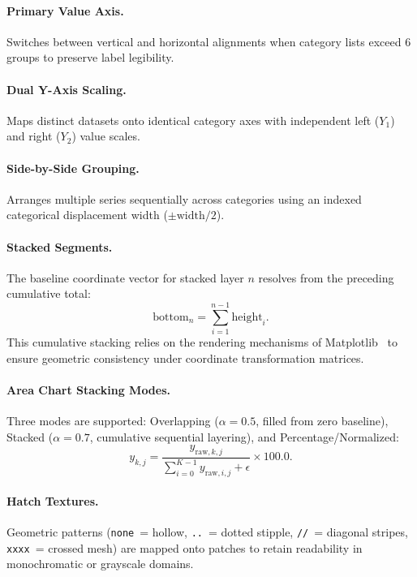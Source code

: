 \documentclass[11pt,twocolumn]{article}
\begin{document}
\paragraph{Primary Value Axis.} Switches between vertical and horizontal alignments when category lists exceed 6 groups to preserve label legibility.

\paragraph{Dual Y-Axis Scaling.} Maps distinct datasets onto identical category axes with independent left ($Y_1$) and right ($Y_2$) value scales.

\paragraph{Side-by-Side Grouping.} Arranges multiple series sequentially across categories using an indexed categorical displacement width ($\pm\text{width}/2$).

\paragraph{Stacked Segments.} The baseline coordinate vector for stacked layer $n$ resolves from the preceding cumulative total:
\begin{equation}\label{eq:stacked_bottom}
  \text{bottom}_n = \sum_{i=1}^{n-1} \text{height}_i.
\end{equation}
This cumulative stacking relies on the rendering mechanisms of Matplotlib~\cite{hunter2007matplotlib} to ensure geometric consistency under coordinate transformation matrices.

\paragraph{Area Chart Stacking Modes.} Three modes are supported: Overlapping ($\alpha=0.5$, filled from zero baseline), Stacked ($\alpha=0.7$, cumulative sequential layering), and Percentage/Normalized:
\begin{equation}\label{eq:pct_norm}
  y_{k,j} = \frac{y_{\text{raw},k,j}}{\sum_{i=0}^{K-1} y_{\text{raw},i,j} + \epsilon}\times 100.0.
\end{equation}

\paragraph{Hatch Textures.} Geometric patterns (\texttt{none}~= hollow, \texttt{..}~= dotted stipple, \texttt{//}~= diagonal stripes, \texttt{xxxx}~= crossed mesh) are mapped onto patches to retain readability in monochromatic or grayscale domains.
\end{document}

